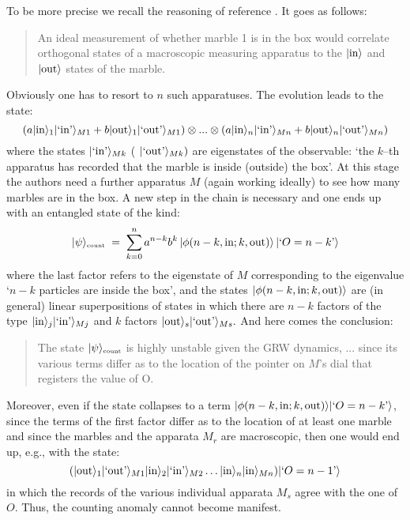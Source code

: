 \documentclass[12pt]{article}
\begin{document}
To be more precise we recall the reasoning of reference
\cite{cli1}. It goes as follows:
\begin{quotation}
An ideal measurement of whether marble 1 is in the box would
correlate orthogonal states of a macroscopic measuring apparatus
to the $|\makebox{in}\rangle$ and $|\makebox{out}\rangle$ states
of the marble.
\end{quotation}
Obviously one has to resort to $n$ such apparatuses. The evolution
leads to the state:
\begin{equation} \label{f}
(a|\makebox{in}\rangle_{1} |\makebox{`in'}\rangle_{M1} +
b|\makebox{out}\rangle_{1} |\makebox{`out'}\rangle_{M1}) \otimes
...\otimes (a|\makebox{in}\rangle_{n} |\makebox{`in'}\rangle_{Mn}
+ b|\makebox{out}\rangle_{n} |\makebox{`out'}\rangle_{Mn})
\end{equation}
where the states $|\makebox{`in'}\rangle_{Mk}$ (
$|\makebox{`out'}\rangle_{Mk})$ are eigenstates of the observable:
`the $k$--th apparatus has recorded that the marble is inside
(outside) the box'. At this stage the authors need a further
apparatus $M$ (again working ideally) to see how many marbles are
in the box. A new step in the chain is necessary and one ends up
with an entangled state of the kind:
\begin{equation} \label{g}
|\psi\rangle_{\makebox{\tiny count}} \; = \;
\sum_{k=0}^{n}a^{n-k}b^{k}\, |\phi
(n-k,\makebox{in};k,\makebox{out})\rangle \, |\makebox{`$O =
n-k$'}\rangle
\end{equation}
where the last factor refers to the eigenstate of $M$
corresponding to the eigenvalue `$n-k$ particles are inside the
box', and the states $|\phi
(n-k,\makebox{in};k,\makebox{out})\rangle$ are (in general) linear
superpositions of states in which there are $n-k$ factors of the
type $|\makebox{in}\rangle_{j}|\makebox{`in'}\rangle_{Mj}$ and $k$
factors $|\makebox{out}\rangle_{s}|\makebox{`out'}\rangle_{Ms}.$
And here comes the conclusion:
\begin{quotation}
The state $|\psi\rangle_{\makebox{\tiny count}}$ is highly
unstable given the GRW dynamics, ... since its various terms
differ as to the location of the pointer on $M$'s dial that
registers the value of O.
\end{quotation}
Moreover, even if the state collapses to a term $|\phi
(n-k,\makebox{in};k,\makebox{out})\rangle |\makebox{`$O =
n-k$'}\rangle$,  since the terms of the first factor differ as to
the location of at least one marble and since the marbles and the
apparata $M_{r}$ are macroscopic, then one would end up, e.g.,
with the state:
\begin{equation} \label{h}
(|\makebox{out}\rangle_{1} |\makebox{`out'}\rangle_{M1}
|\makebox{in}\rangle_{2} |\makebox{`in'}\rangle_{M2} \ldots
|\makebox{in}\rangle_{n} |\makebox{in}\rangle_{Mn}) |\makebox{`$O
= n - 1$'}\rangle
\end{equation}
in which the records of the various individual apparata $M_{s}$
agree with the one of $O$. Thus, the counting anomaly cannot
become manifest.
\end{document}
